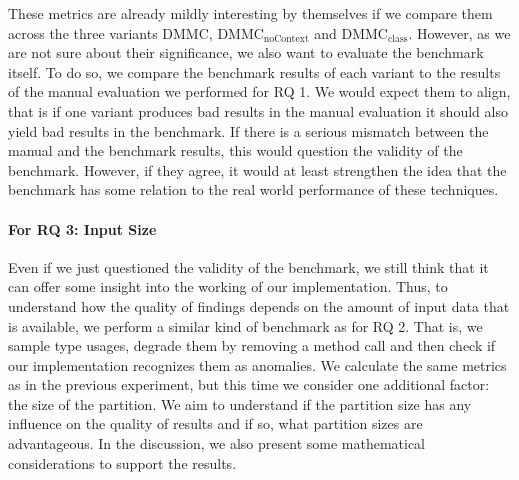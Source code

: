 

These metrics are already mildly interesting by themselves if we compare them across the three variants $\text{DMMC}$, $\text{DMMC}_\text{noContext}$ and $\text{DMMC}_\text{class}$.
However, as we are not sure about their significance, we also want to evaluate the benchmark itself.
To do so, we compare the benchmark results of each variant to the results of the manual evaluation we performed for RQ 1.
We would expect them to align, that is if one variant produces bad results in the manual evaluation it should also yield bad results in the benchmark.
If there is a serious mismatch between the manual and the benchmark results, this would question the validity of the benchmark.
However, if they agree, it would at least strengthen the idea that the benchmark has some relation to the real world performance of these techniques.


\paragraph{For RQ 3: Input Size}

Even if we just questioned the validity of the benchmark, we still think that it can offer some insight into the working of our implementation.
Thus, to understand how the quality of findings depends on the amount of input data that is available, we perform a similar kind of benchmark as for RQ 2.
That is, we sample type usages, degrade them by removing a method call and then check if our implementation recognizes them as anomalies.
We calculate the same metrics as in the previous experiment, but this time we consider one additional factor: the size of the partition.
We aim to understand if the partition size has any influence on the quality of results and if so, what partition sizes are advantageous.
In the discussion, we also present some mathematical considerations to support the results.
    
